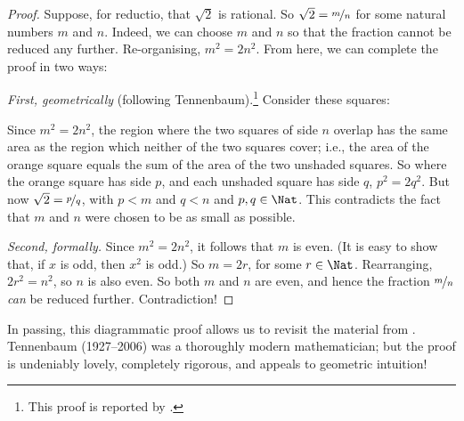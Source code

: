 \documentclass[../../../include/open-logic-section]{subfiles}
\begin{document}
\begin{proof}
Suppose, for reductio, that $\sqrt{2}$ is rational. So $\sqrt{2} =
\nicefrac{m}{n}$ for some natural numbers $m$ and $n$. Indeed, we can
choose $m$ and $n$ so that the fraction cannot be reduced any further.
Re-organising, $m^{2} = 2n^{2}$. From here, we can complete the proof
in two ways:

\emph{First, geometrically} (following Tennenbaum).\footnote{This
proof is reported by \cite{Conway2006}.} Consider these squares:
\begin{center}	
\end{center}
Since $m^2 = 2n^2$, the region where the two squares of side $n$
overlap has the same area as the region which neither of the two
squares cover; i.e., the area of the orange square equals the sum of
the area of the two unshaded squares. So where the orange square has
side $p$, and each unshaded square has side $q$, $p^2 = 2q^2$. But now
$\sqrt{2} = \nicefrac{p}{q}$, with $p < m$ and $q < n$ and $p, q \in
\Nat$. This contradicts the fact that $m$ and $n$ were chosen to be as
small as possible.
		
\emph{Second, formally.} Since $m^{2} = 2n^{2}$, it follows that $m$
is even. (It is easy to show that, if $x$ is odd, then $x^2$ is odd.)
So $m = 2r$, for some $r \in \Nat$. Rearranging, $2r^2 = n^2$, 
so $n$ is also even. So both $m$ and $n$ are even, and hence the
fraction $\nicefrac{m}{n}$ \emph{can} be reduced further.
Contradiction!
\end{proof}

In passing, this diagrammatic proof allows us to revisit the material from . Tennenbaum (1927--2006) was a thoroughly modern mathematician; but the proof is undeniably lovely, completely rigorous, and appeals to geometric intuition!
\end{document}
